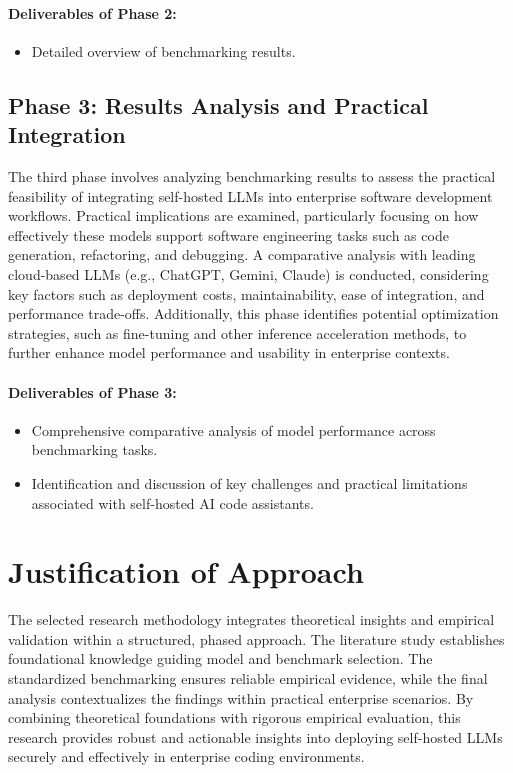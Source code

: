 \paragraph{Deliverables of Phase 2:}

\begin{itemize}
    \item Detailed overview of benchmarking results.
\end{itemize}

\subsection{Phase 3: Results Analysis and Practical Integration}

The third phase involves analyzing benchmarking results to assess the practical feasibility of integrating self-hosted LLMs into enterprise software development workflows. Practical implications are examined, particularly focusing on how effectively these models support software engineering tasks such as code generation, refactoring, and debugging.
A comparative analysis with leading cloud-based LLMs (e.g., ChatGPT, Gemini, Claude) is conducted, considering key factors such as deployment costs, maintainability, ease of integration, and performance trade-offs.
Additionally, this phase identifies potential optimization strategies, such as fine-tuning and other inference acceleration methods, to further enhance model performance and usability in enterprise contexts.

\paragraph{Deliverables of Phase 3:}

\begin{itemize}
    \item Comprehensive comparative analysis of model performance across benchmarking tasks.
    \item Identification and discussion of key challenges and practical limitations associated with self-hosted AI code assistants.
\end{itemize}

\section{Justification of Approach}
\label{sec:justification-of-approach}

The selected research methodology integrates theoretical insights and empirical validation within a structured, phased approach. The literature study establishes foundational knowledge guiding model and benchmark selection. The standardized benchmarking ensures reliable empirical evidence, while the final analysis contextualizes the findings within practical enterprise scenarios.
By combining theoretical foundations with rigorous empirical evaluation, this research provides robust and actionable insights into deploying self-hosted LLMs securely and effectively in enterprise coding environments.

